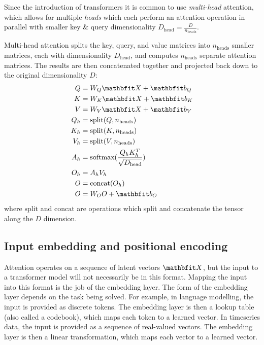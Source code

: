 Since the introduction of transformers it is common to use \textit{multi-head} attention, which allows for multiple \textit{heads} which each perform an attention operation in parallel with smaller key \& query dimensionality $D_{\text{head}} = \frac{D}{ n_{\text{heads}}}$.

Multi-head attention splits the key, query, and value matrices into $n_{\text{heads}}$ smaller matrices, each with dimensionality $D_{\text{head}}$, and computes $n_{\text{heads}}$ separate attention matrices. The results are then concatenated together and projected back down to the original dimensionality $D$:
\begin{align}
\begin{aligned}
\label{eqn:multi-head-attn}
Q &= W_{Q} \X + \vb_{Q} \\
K &= W_{K} \X + \vb_{K} \\
V &= W_{V} \X + \vb_{V} \\
Q_{h} &= \text{split}(Q, n_{\text{heads}}) \\
K_{h} &= \text{split}(K, n_{\text{heads}}) \\
V_{h} &= \text{split}(V, n_{\text{heads}}) \\
A_{h} &= \text{softmax}(\frac{Q_{h}K_{h}^T}{\sqrt{D_{\text{head}}}}) \\
O_{h} &= A_{h}V_{h} \\
O &= \text{concat}(O_{h}) \\
O &= W_{O}O + \vb_{O}
\end{aligned}
\end{align}
where $\text{split}$ and $\text{concat}$ are operations which split and concatenate the tensor along the $D$ dimension.

\subsection{Input embedding and positional encoding}
\label{ss:transformer-inputs}

Attention operates on a sequence of latent vectors $\X$, but the input to a transformer model will not necessarily be in this format. Mapping the input into this format is the job of the embedding layer. The form of the embedding layer depends on the task being solved. For example, in language modelling, the input is provided as discrete tokens. The embedding layer is then a lookup table (also called a codebook), which maps each token to a learned vector. In timeseries data, the input is provided as a sequence of real-valued vectors. The embedding layer is then a linear transformation, which maps each vector to a learned vector.

